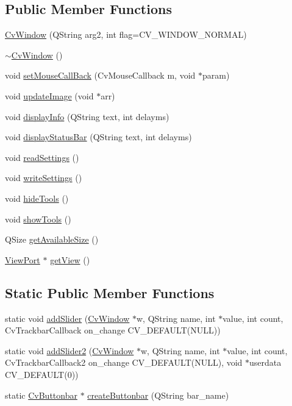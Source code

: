 \subsection*{Public Member Functions}
\begin{DoxyCompactItemize}
\item 
\hyperlink{classCvWindow_a2d516104e7e29c293d53a3797f29fff6}{Cv\-Window} (Q\-String arg2, int flag=C\-V\-\_\-\-W\-I\-N\-D\-O\-W\-\_\-\-N\-O\-R\-M\-A\-L)
\item 
\hyperlink{classCvWindow_aac9ea5f91071477dc506ed9a04f758f1}{$\sim$\-Cv\-Window} ()
\item 
void \hyperlink{classCvWindow_a8fa9463b57ffb2f049703a6f14e586fb}{set\-Mouse\-Call\-Back} (Cv\-Mouse\-Callback m, void $\ast$param)
\item 
void \hyperlink{classCvWindow_a9fc4a9246e0ea710076d2d58851ce1f8}{update\-Image} (void $\ast$arr)
\item 
void \hyperlink{classCvWindow_a577841174681451e47735cc125de0af9}{display\-Info} (Q\-String text, int delayms)
\item 
void \hyperlink{classCvWindow_a37a9d43cf4e722abbb32a20fc507c8a9}{display\-Status\-Bar} (Q\-String text, int delayms)
\item 
void \hyperlink{classCvWindow_a7f8fdaeec81ca1900a8878bdfc779f13}{read\-Settings} ()
\item 
void \hyperlink{classCvWindow_a30c9687c99f22a7f7d9a61c00bf42a57}{write\-Settings} ()
\item 
void \hyperlink{classCvWindow_a40da445af152145b663ebdc5a2547351}{hide\-Tools} ()
\item 
void \hyperlink{classCvWindow_a0e911ed5861b7d39a991671af7aabfbc}{show\-Tools} ()
\item 
Q\-Size \hyperlink{classCvWindow_a323bcaa31cfe862e2b13a110248293cc}{get\-Available\-Size} ()
\item 
\hyperlink{classViewPort}{View\-Port} $\ast$ \hyperlink{classCvWindow_a6bfa17ceb41e3fad856b9dd32d25e048}{get\-View} ()
\end{DoxyCompactItemize}
\subsection*{Static Public Member Functions}
\begin{DoxyCompactItemize}
\item 
static void \hyperlink{classCvWindow_a2ed13c03bc5fa9fd2e7b579d2fc1bd6d}{add\-Slider} (\hyperlink{classCvWindow}{Cv\-Window} $\ast$w, Q\-String name, int $\ast$value, int count, Cv\-Trackbar\-Callback on\-\_\-change C\-V\-\_\-\-D\-E\-F\-A\-U\-L\-T(N\-U\-L\-L))
\item 
static void \hyperlink{classCvWindow_a87c0aa2a8a5986293be621a9f949e33e}{add\-Slider2} (\hyperlink{classCvWindow}{Cv\-Window} $\ast$w, Q\-String name, int $\ast$value, int count, Cv\-Trackbar\-Callback2 on\-\_\-change C\-V\-\_\-\-D\-E\-F\-A\-U\-L\-T(N\-U\-L\-L), void $\ast$userdata C\-V\-\_\-\-D\-E\-F\-A\-U\-L\-T(0))
\item 
static \hyperlink{classCvButtonbar}{Cv\-Buttonbar} $\ast$ \hyperlink{classCvWindow_a219c9032d1611f4e394eae3dea4011ab}{create\-Buttonbar} (Q\-String bar\-\_\-name)
\end{DoxyCompactItemize}
